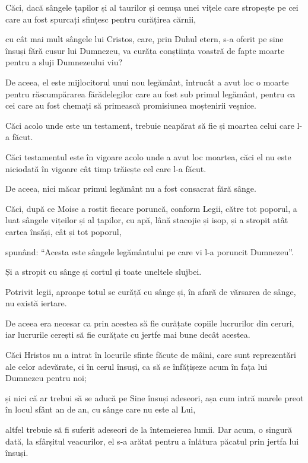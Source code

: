 {Căci, dacă sângele țapilor și al taurilor și cenușa unei vițele care stropește pe cei care au fost spurcați sfințesc pentru curățirea cărnii,

cu cât mai mult sângele lui Cristos, care, prin Duhul etern, s-a oferit pe sine însuși fără cusur lui Dumnezeu, va curăța conștiința voastră de fapte moarte pentru a sluji Dumnezeului viu?

De aceea, el este mijlocitorul unui nou legământ, întrucât a avut loc o moarte pentru răscumpărarea fărădelegilor care au fost sub primul legământ, pentru ca cei care au fost chemați să primească promisiunea moștenirii veșnice.

Căci acolo unde este un testament, trebuie neapărat să fie și moartea celui care l-a făcut.

Căci testamentul este în vigoare acolo unde a avut loc moartea, căci el nu este niciodată în vigoare cât timp trăiește cel care l-a făcut.

De aceea, nici măcar primul legământ nu a fost consacrat fără sânge.

Căci, după ce Moise a rostit fiecare poruncă, conform Legii, către tot poporul, a luat sângele vițeilor și al țapilor, cu apă, lână stacojie și isop, și a stropit atât cartea însăși, cât și tot poporul,

spunând: “Acesta este sângele legământului pe care vi l-a poruncit Dumnezeu”.


\par }{\PP {}Și a stropit cu sânge și cortul și toate uneltele slujbei.

Potrivit legii, aproape totul se curăță cu sânge și, în afară de vărsarea de sânge, nu există iertare.


\par }{\PP {}De aceea era necesar ca prin acestea să fie curățate copiile lucrurilor din ceruri, iar lucrurile cerești să fie curățate cu jertfe mai bune decât acestea.

Căci Hristos nu a intrat în locurile sfinte făcute de mâini, care sunt reprezentări ale celor adevărate, ci în cerul însuși, ca să se înfățișeze acum în fața lui Dumnezeu pentru noi;

și nici că ar trebui să se aducă pe Sine însuși adeseori, așa cum intră marele preot în locul sfânt an de an, cu sânge care nu este al Lui,

altfel trebuie să fi suferit adeseori de la întemeierea lumii. Dar acum, o singură dată, la sfârșitul veacurilor, el s-a arătat pentru a înlătura păcatul prin jertfa lui însuși.

}
